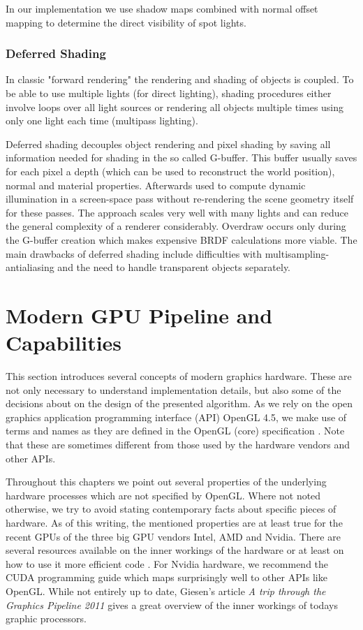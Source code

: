 \documentclass[thesis.tex]{subfiles}
\begin{document}
In our implementation we use shadow maps combined with normal offset mapping to determine the direct visibility of spot lights. 

\subsubsection{Deferred Shading}
In classic "forward rendering" the rendering and shading of objects is coupled.
To be able to use multiple lights (for direct lighting), shading procedures either involve loops over all light sources or rendering all objects multiple times using only one light each time (multipass lighting).

Deferred shading decouples object rendering and pixel shading by saving all information needed for shading in the so called G-buffer. 
This buffer usually saves for each pixel a depth (which can be used to reconstruct the world position), normal and material properties.
Afterwards used to compute dynamic illumination in a screen-space pass without re-rendering the scene geometry itself for these passes.
The approach scales very well with many lights and can reduce the general complexity of a renderer considerably.
Overdraw occurs only during the G-buffer creation which makes expensive BRDF calculations more viable.
The main drawbacks of deferred shading include difficulties with multisampling-antialiasing and the need to handle transparent objects separately.

\section{Modern GPU Pipeline and Capabilities}
This section introduces several concepts of modern graphics hardware.
These are not only necessary to understand implementation details, but also some of the decisions about on the design of the presented algorithm.
As we rely on the open graphics application programming interface (API) OpenGL 4.5, we make use of terms and names as they are defined in the OpenGL (core) specification \cite{bib:openglspec}.
Note that these are sometimes different from those used by the hardware vendors and other APIs.

Throughout this chapters we point out several properties of the underlying hardware processes which are not specified by OpenGL.
Where not noted otherwise, we try to avoid stating contemporary facts about specific pieces of hardware.
As of this writing, the mentioned properties are at least true for the recent GPUs of the three big GPU vendors Intel, AMD and Nvidia.
There are several resources available on the inner workings of the hardware or at least on how to use it more efficient code \cite{bib:intelhardwaredoc, bib:amdhardwaredoc}.
For Nvidia hardware, we recommend the CUDA programming guide \cite{bib:cudaprogguide} which maps surprisingly well to other APIs like OpenGL.
While not entirely up to date, Giesen's article \emph{A trip through the Graphics Pipeline 2011} \cite{bib:tripthroughgraphicspipe} gives a great overview of the inner workings of todays graphic processors.
\end{document}
